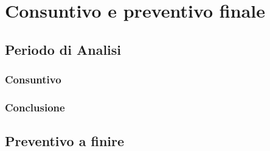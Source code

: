 \documentclass[PianoDiProgetto.tex]{subfiles}
\begin{document}
\chapter{Consuntivo e preventivo finale}

\section{Periodo di Analisi}
\subsection{Consuntivo}
\subsection{Conclusione}

\section{Preventivo a finire}
\end{document}
